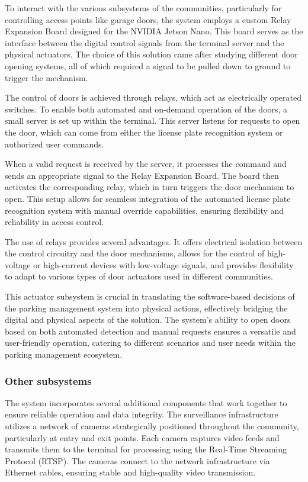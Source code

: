 To interact with the various subsystems of the communities, particularly for controlling access points like garage doors, the system employs a custom Relay Expansion Board designed for the NVIDIA Jetson Nano. This board serves as the interface between the digital control signals from the terminal server and the physical actuators. The choice of this solution came after studying different door opening systems, all of which required a signal to be pulled down to ground to trigger the mechanism.

The control of doors is achieved through relays, which act as electrically operated switches. To enable both automated and on-demand operation of the doors, a small server is set up within the terminal. This server listens for requests to open the door, which can come from either the license plate recognition system or authorized user commands.

When a valid request is received by the server, it processes the command and sends an appropriate signal to the Relay Expansion Board. The board then activates the corresponding relay, which in turn triggers the door mechanism to open. This setup allows for seamless integration of the automated license plate recognition system with manual override capabilities, ensuring flexibility and reliability in access control.

The use of relays provides several advantages. It offers electrical isolation between the control circuitry and the door mechanisms, allows for the control of high-voltage or high-current devices with low-voltage signals, and provides flexibility to adapt to various types of door actuators used in different communities.

This actuator subsystem is crucial in translating the software-based decisions of the parking management system into physical actions, effectively bridging the digital and physical aspects of the solution. The system's ability to open doors based on both automated detection and manual requests ensures a versatile and user-friendly operation, catering to different scenarios and user needs within the parking management ecosystem.

\subsubsection{Other subsystems}

The system incorporates several additional components that work together to ensure reliable operation and data integrity. The surveillance infrastructure utilizes a network of cameras strategically positioned throughout the community, particularly at entry and exit points. Each camera captures video feeds and transmits them to the terminal for processing using the Real-Time Streaming Protocol (RTSP). The cameras connect to the network infrastructure via Ethernet cables, ensuring stable and high-quality video transmission.

